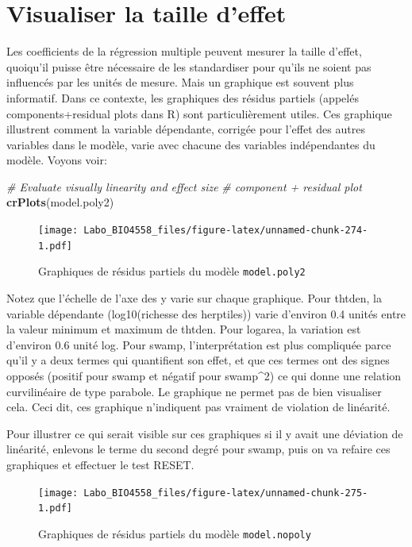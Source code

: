 \documentclass[12pt,]{book}
\newenvironment{Shaded}{\begin{snugshade}}{\end{snugshade}}
\newcommand{\CommentTok}[1]{\textcolor[rgb]{0.56,0.35,0.01}{\textit{#1}}}
\newcommand{\KeywordTok}[1]{\textcolor[rgb]{0.13,0.29,0.53}{\textbf{#1}}}
\newcommand{\NormalTok}[1]{#1}
\begin{document}
\hypertarget{visualiser-la-taille-deffet}{%
\section{Visualiser la taille d'effet}\label{visualiser-la-taille-deffet}}

Les coefficients de la régression multiple peuvent mesurer la taille d'effet, quoiqu'il puisse être nécessaire de les standardiser pour qu'ils ne soient pas influencés par les unités de mesure. Mais un graphique est souvent plus informatif. Dans ce contexte, les graphiques des résidus partiels (appelés components+residual plots dans R) sont particulièrement utiles. Ces graphique illustrent comment la variable dépendante, corrigée pour l'effet des autres variables dans le modèle, varie avec chacune des variables indépendantes du modèle. Voyons voir:

\begin{Shaded}
\begin{Highlighting}[]
\CommentTok{# Evaluate visually linearity and effect size}
\CommentTok{# component + residual plot}
\KeywordTok{crPlots}\NormalTok{(model.poly2)}
\end{Highlighting}
\end{Shaded}

\begin{figure}
\centering
\texttt{[image: Labo\_BIO4558\_files/figure-latex/unnamed-chunk-274-1.pdf]}
\caption{\label{fig:unnamed-chunk-274}Graphiques de résidus partiels du modèle \texttt{model.poly2}}
\end{figure}

Notez que l'échelle de l'axe des y varie sur chaque graphique. Pour thtden, la variable dépendante (log10(richesse des herptiles)) varie d'environ 0.4 unités entre la valeur minimum et maximum de thtden. Pour logarea, la variation est d'environ 0.6 unité log. Pour swamp, l'interprétation est plus compliquée parce qu'il y a deux termes qui quantifient son effet, et que ces termes ont des signes opposés (positif pour swamp et négatif pour swamp\^{}2) ce qui donne une relation curvilinéaire de type parabole. Le graphique ne permet pas de bien visualiser cela. Ceci dit, ces graphique n'indiquent pas vraiment de violation de linéarité.

Pour illustrer ce qui serait visible sur ces graphiques si il y avait une déviation de linéarité, enlevons le terme du second degré pour swamp, puis on va refaire ces graphiques et effectuer le test RESET.

\begin{figure}
\centering
\texttt{[image: Labo\_BIO4558\_files/figure-latex/unnamed-chunk-275-1.pdf]}
\caption{\label{fig:unnamed-chunk-275}Graphiques de résidus partiels du modèle \texttt{model.nopoly}}
\end{figure}
\end{document}
